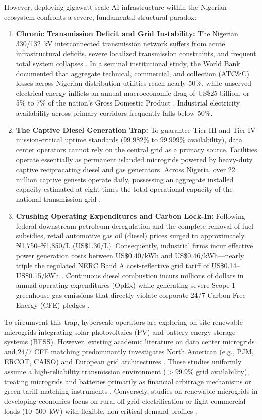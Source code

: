 \documentclass[12pt,3p,review]{elsarticle}
\begin{document}
However, deploying gigawatt-scale AI infrastructure within the Nigerian ecosystem confronts a severe, fundamental structural paradox:
\begin{enumerate}
    \item \textbf{Chronic Transmission Deficit and Grid Instability:} The Nigerian 330/132~kV interconnected transmission network suffers from acute infrastructural deficits, severe localized transmission constraints, and frequent total system collapses \cite{Arowolo2022}. In a seminal institutional study, the World Bank documented that aggregate technical, commercial, and collection (ATC\&C) losses across Nigerian distribution utilities reach nearly 50\%, while unserved electrical energy inflicts an annual macroeconomic drag of US\$25 billion, or 5\% to 7\% of the nation's Gross Domestic Product \cite{WorldBank2020}. Industrial electricity availability across primary corridors frequently falls below 50\%.
    \item \textbf{The Captive Diesel Generation Trap:} To guarantee Tier-III and Tier-IV mission-critical uptime standards ($99.982\%$ to $99.999\%$ availability), data center operators cannot rely on the central grid as a primary source. Facilities operate essentially as permanent islanded microgrids powered by heavy-duty captive reciprocating diesel and gas generators. Across Nigeria, over 22 million captive gensets operate daily, possessing an aggregate installed capacity estimated at eight times the total operational capacity of the national transmission grid \cite{WorldBank2020, Oseni2012}.
    \item \textbf{Crushing Operating Expenditures and Carbon Lock-In:} Following federal downstream petroleum deregulation and the complete removal of fuel subsidies, retail automotive gas oil (diesel) prices surged to approximately ₦1,750--₦1,850/L (US\$1.30/L). Consequently, industrial firms incur effective power generation costs between US\$0.40/kWh and US\$0.46/kWh—nearly triple the regulated NERC Band A cost-reflective grid tariff of US\$0.14--US\$0.15/kWh \cite{WorldBank2020, NERC2024}. Continuous diesel combustion incurs millions of dollars in annual operating expenditures (OpEx) while generating severe Scope 1 greenhouse gas emissions that directly violate corporate 24/7 Carbon-Free Energy (CFE) pledges \cite{Xu2024}.
\end{enumerate}

To circumvent this trap, hyperscale operators are exploring on-site renewable microgrids integrating solar photovoltaics (PV) and battery energy storage systems (BESS). However, existing academic literature on data center microgrids and 24/7 CFE matching predominantly investigates North American (e.g., PJM, ERCOT, CAISO) and European grid architectures \cite{Bistline2023, Riepin2022}. These studies uniformly assume a high-reliability transmission environment ($>99.9\%$ grid availability), treating microgrids and batteries primarily as financial arbitrage mechanisms or green-tariff matching instruments \cite{Radovanovic2022}. Conversely, studies on renewable microgrids in developing economies focus on rural off-grid electrification or light commercial loads (10--500~kW) with flexible, non-critical demand profiles \cite{Babatunde2020}.
\end{document}
